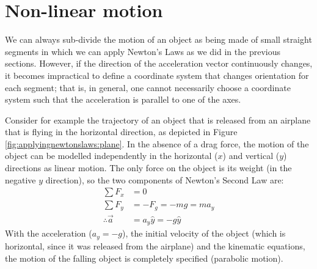 \section{Non-linear motion}
We can always sub-divide the motion of an object as being made of small straight segments in which we can apply Newton's Laws as we did in the previous sections. However, if the direction of the acceleration vector continuously changes, it becomes impractical to define a coordinate system that changes orientation for each segment; that is, in general, one cannot necessarily choose a coordinate system such that the acceleration is parallel to one of the axes. 

Consider for example the trajectory of an object that is released from an airplane that is flying in the horizontal direction, as depicted in Figure \ref{fig:applyingnewtonslaws:plane}. 
In the absence of a drag force, the motion of the object can be modelled independently in the horizontal ($x$) and vertical ($y$) directions as linear motion.  The only force on the object is its weight (in the negative $y$ direction), so the two components of Newton's Second Law are:
\begin{align*}
\sum F_x &= 0\\
\sum F_y &= -F_g = -mg = ma_y\\
\therefore \vec a &= a_y \hat y=-g\hat y
\end{align*}
With the acceleration ($a_y=-g$), the initial velocity of the object (which is horizontal, since it was released from the airplane) and the kinematic equations, the motion of the falling object is completely specified (parabolic motion). 

